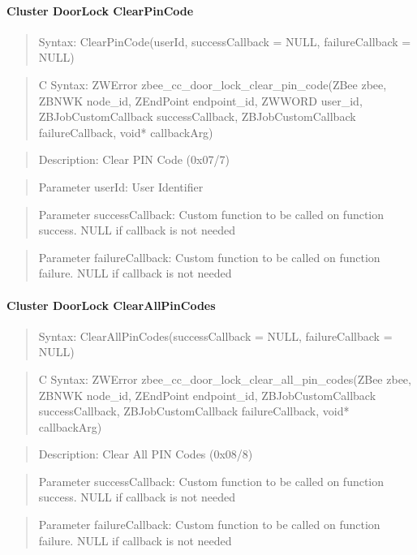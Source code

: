 \paragraph{Cluster DoorLock ClearPinCode}
\begin{quote}Syntax: ClearPinCode(userId, successCallback = NULL, failureCallback = NULL)\end{quote}
\begin{quote}C Syntax: ZWError zbee\_cc\_door\_lock\_clear\_pin\_code(ZBee zbee, ZBNWK node\_id, ZEndPoint endpoint\_id, ZWWORD user\_id, ZBJobCustomCallback successCallback, ZBJobCustomCallback failureCallback, void* callbackArg)\end{quote}
\begin{quote}Description: Clear PIN Code (0x07/7)\end{quote}
\begin{quote}Parameter userId: User Identifier\end{quote}
\begin{quote}Parameter successCallback: Custom function to be called on function success. NULL if callback is not needed\end{quote}
\begin{quote}Parameter failureCallback: Custom function to be called on function failure. NULL if callback is not needed\end{quote}


\paragraph{Cluster DoorLock ClearAllPinCodes}
\begin{quote}Syntax: ClearAllPinCodes(successCallback = NULL, failureCallback = NULL)\end{quote}
\begin{quote}C Syntax: ZWError zbee\_cc\_door\_lock\_clear\_all\_pin\_codes(ZBee zbee, ZBNWK node\_id, ZEndPoint endpoint\_id, ZBJobCustomCallback successCallback, ZBJobCustomCallback failureCallback, void* callbackArg)\end{quote}
\begin{quote}Description: Clear All PIN Codes (0x08/8)\end{quote}
\begin{quote}Parameter successCallback: Custom function to be called on function success. NULL if callback is not needed\end{quote}
\begin{quote}Parameter failureCallback: Custom function to be called on function failure. NULL if callback is not needed\end{quote}


